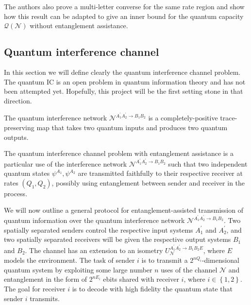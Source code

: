 \documentclass[aps,11pt,twoside,letterpaper]{article}
\begin{document}
		The authors also prove a multi-letter converse for the same rate region
		and show how this result can be adapted to give an inner bound
		for the quantum capacity $\mathcal{Q}\!\left(\mathcal{N}\right)$ without 
		entanglement assistance.
		

		


	
	\subsection{Quantum interference channel}

		
		In this section we will define clearly the quantum interference channel problem.
		The quantum IC is an open problem in quantum information theory and has
		not been attempted yet. 
		Hopefully, this project will be the first setting stone in that direction.
		
		\begin{definition}
			The quantum interference network $\mathcal{N}^{A_{1}^{\prime}A_{2}^{\prime}\rightarrow B_{1}B_{2}}$
			is a completely-positive trace-preserving map that takes two quantum inputs 
			and produces two quantum outputs.
		\end{definition}
		
		\begin{definition}
			The quantum interference channel problem with entanglement assistance 
			is a particular use of the interference network 
			$\mathcal{N}^{A_{1}^{\prime}A_{2}^{\prime}\rightarrow B_{1}B_{2}}$ such
			that two independent quantum states $\psi^{A_1},\psi^{A_2}$ 
			are transmitted faithfully to their respective receiver at rates $(Q_1,Q_2)$,
			possibly using entanglement between sender and receiver in the process.
		\end{definition}
		
		We will now outline a general protocol for entanglement-assisted
		transmission of quantum information over the quantum interference network
		$\mathcal{N}^{A_{1}^{\prime}A_{2}^{\prime}\rightarrow B_{1}B_{2}}$. 
		Two spatially separated senders control the respective input systems
		$A_{1}^{\prime}$ and $A_{2}^{\prime}$, and two spatially separated receivers
		will be given the respective output systems $B_{1}$ and $B_{2}$. 
		The channel has an	extension to an isometry $U_{\mathcal{N}}^{A_{1}^{\prime}A_{2}^{\prime
		}\rightarrow B_{1}B_{2}E}$, where $E$ models the environment.
		The task of sender $i$ is to transmit a $2^{nQ_{i}}$-dimensional quantum
		system by exploiting some large number $n$ uses of the channel $\mathcal{N}$
		and entanglement in the form of $2^{nE_{i}}$ ebits shared with receiver $i$,
		where $i\in\left\{  1,2\right\}  $. The goal for receiver $i$ is to decode
		with high fidelity the quantum state that sender $i$ transmits.
\end{document}
